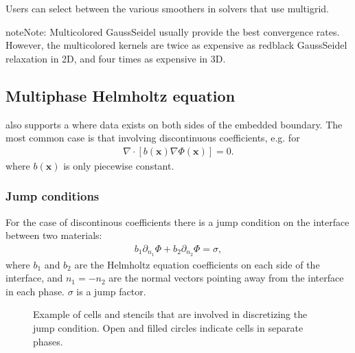 \documentclass[letterpaper,10pt,english]{sphinxmanual}
\let\sphinxpxdimen\pdfpxdimen\else\newdimen\sphinxpxdimen
\begin{document}
Users can select between the various smoothers in solvers that use multigrid.

\begin{sphinxadmonition}{note}{Note:}
Multi\sphinxhyphen{}colored Gauss\sphinxhyphen{}Seidel usually provide the best convergence rates.
However, the multi\sphinxhyphen{}colored kernels are twice as expensive as red\sphinxhyphen{}black Gauss\sphinxhyphen{}Seidel relaxation in 2D, and four times as expensive in 3D.
\end{sphinxadmonition}


\subsection{Multiphase Helmholtz equation}
\label{\detokenize{Source/LinearSolvers:multiphase-helmholtz-equation}}
 also supports a  where data exists on both sides of the embedded boundary.
The most common case is that involving discontinuous coefficients, e.g. for
\begin{equation*}
\begin{split}\nabla\cdot\left[b\left(\mathbf{x}\right)\nabla\Phi\left(\mathbf{x}\right)\right] = 0.\end{split}
\end{equation*}
where \(b\left(\mathbf{x}\right)\) is only piecewise constant.


\subsubsection{Jump conditions}
\label{\detokenize{Source/LinearSolvers:jump-conditions}}
For the case of discontinous coefficients there is a jump condition on the interface between two materials:
\begin{equation*}
\begin{split}b_1\partial_{n_1}\Phi + b_2\partial_{n_2}\Phi = \sigma,\end{split}
\end{equation*}
where \(b_1\) and \(b_2\) are the Helmholtz equation coefficients on each side of the interface, and \(n_1 = -n_2\) are the normal vectors pointing away from the interface in each phase.
\(\sigma\) is a jump factor.

\begin{figure}[htb]
\centering
\capstart

\noindent\sphinxincludegraphics[width=360\sphinxpxdimen]{{JumpCondition}.png}
\caption{Example of cells and stencils that are involved in discretizing the jump condition. Open and filled circles indicate cells in separate phases.}\label{\detokenize{Source/LinearSolvers:id6}}\label{\detokenize{Source/LinearSolvers:fig-jumpcondition}}\end{figure}
\end{document}
